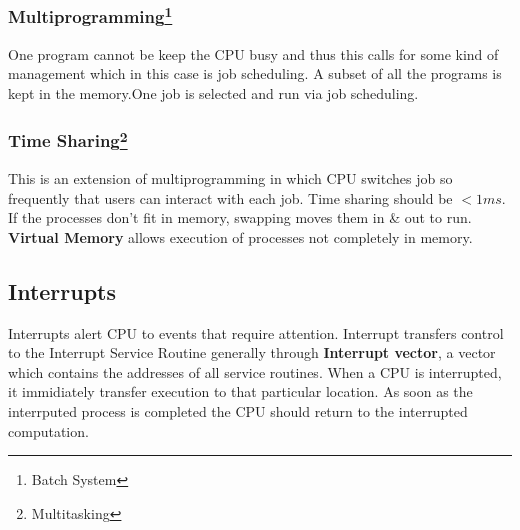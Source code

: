 \documentclass[./OperatingSystems.tex]{subfiles}
\begin{document}
\subsubsection*{Multiprogramming\footnote{Batch System}}
One program cannot be keep the CPU busy and thus this calls for some kind of management which in this case is job scheduling.
A subset of all the programs is kept in the memory.One job is selected and run via job scheduling.

\subsubsection*{Time Sharing\footnote{Multitasking}}
This is an extension of multiprogramming in which CPU switches job so frequently that users can interact with each job. Time sharing should be $< 1ms$.
If the processes don't fit in memory, swapping moves them in \& out to run. \textbf{Virtual Memory} allows execution of processes not completely in memory.

\subsection{Interrupts}

Interrupts alert CPU to events that require attention. Interrupt transfers control to the Interrupt Service Routine generally through 
\textbf{Interrupt vector}, a vector which contains the addresses of all service routines. When a CPU is interrupted, it immidiately transfer execution to that particular location. 
As soon as the interrputed process is completed the CPU should return to the interrupted computation.
\end{document}
